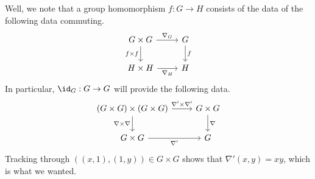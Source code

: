 \documentclass[../notes.tex]{subfiles}
\begin{document}
Well, we note that a group homomorphism $f:G\to H$ consists of the data of the following data commuting.
\[\begin{tikzcd}
	{G\times G} & G \\
	{H\times H} & H
	\arrow["{f\times f}"', from=1-1, to=2-1]
	\arrow["f", from=1-2, to=2-2]
	\arrow["{\nabla_G}", from=1-1, to=1-2]
	\arrow["{\nabla_H}"', from=2-1, to=2-2]
\end{tikzcd}\]
In particular, $\id_G:G\to G$ will provide the following data.
\[\begin{tikzcd}
	{(G\times G)\times(G\times G)} & {G\times G} \\
	{G\times G} & G
	\arrow["\nabla\times\nabla"', from=1-1, to=2-1]
	\arrow["{\nabla'\times\nabla'}", from=1-1, to=1-2]
	\arrow["\nabla", from=1-2, to=2-2]
	\arrow["{\nabla'}"', from=2-1, to=2-2]
\end{tikzcd}\]
Tracking through $((x,1),(1,y))\in G\times G$ shows that $\nabla'(x,y)=xy$, which is what we wanted.
\end{document}
